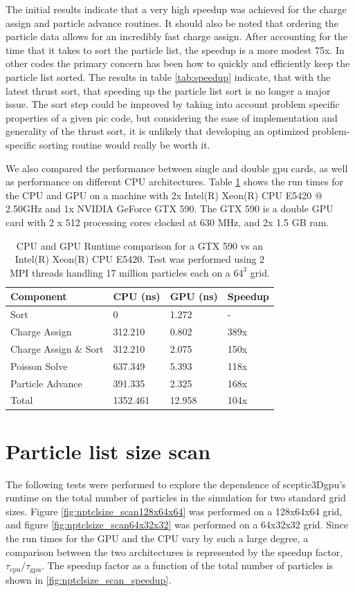 The initial results indicate that a very high speedup was achieved for the charge assign and particle advance routines. It should also be noted that ordering the particle data allows for an incredibly fast charge assign. After accounting for the time that it takes to sort the particle list, the speedup is a more modest 75x. In other codes the primary concern has been how to quickly and efficiently keep the particle list sorted. The results in table \ref{tab:speedup} indicate, that with the latest thrust sort, that speeding up the particle list sort is no longer a major issue. The sort step could be improved by taking into account problem specific properties of a given pic code, but considering the ease of implementation and generality of the thrust sort, it is unlikely that developing an optimized problem-specific sorting routine would really be worth it. 

We also compared the performance between single and double gpu cards, as well as performance on different CPU architectures. Table \ref{tab:speedup2} shows the run times for the CPU and GPU on a machine with 2x  Intel(R) Xeon(R) CPU E5420 @ 2.50GHz and 1x NVIDIA GeForce GTX 590. The GTX 590 is a double GPU card with 2 x 512 processing cores clocked at 630 MHz, and 2x 1.5 GB ram. 

\noindent \begin{table}[h]
\begin{tabular}{| p{4.0cm} | p{3.5cm} | p{2.5cm} | p{4.0cm} |}
\hline
Component & CPU (ns) & GPU (ns) & Speedup \\ \hline
Sort & 0 & 1.272 & - \\ \hline
Charge Assign & 312.210 & 0.802 & 389x \\ \hline
Charge Assign \& Sort & 312.210 & 2.075 & 150x \\ \hline
Poisson Solve & 637.349 & 5.393 & 118x \\ \hline
Particle Advance & 391.335 & 2.325 & 168x \\ \hline
Total\footnote[1] & 1352.461 & 12.958 & 104x \\ \hline
\end{tabular}
\caption{CPU and GPU Runtime comparison for a GTX 590 vs an Intel(R) Xeon(R) CPU E5420. Test was performed using 2 MPI threads handling 17 million particles each on a $64^3$ grid.}
\label{tab:speedup2} 
\end{table} 



	
	\section{Particle list size scan}
The following tests were performed to explore the dependence of sceptic3Dgpu's runtime on the total number of particles in the simulation for two standard grid sizes. Figure \ref{fig:nptclsize_scan128x64x64} was performed on a 128x64x64 grid, and figure \ref{fig:nptclsize_scan64x32x32} was performed on a 64x32x32 grid. Since the run times for the GPU and the CPU vary by such a large degree, a comparison between the two architectures is represented by the speedup factor, $\tau_{\mathrm{cpu}}/\tau_{\mathrm{gpu}}$. The speedup factor as a function of the total number of particles is shown in \ref{fig:nptclsize_scan_speedup}.

